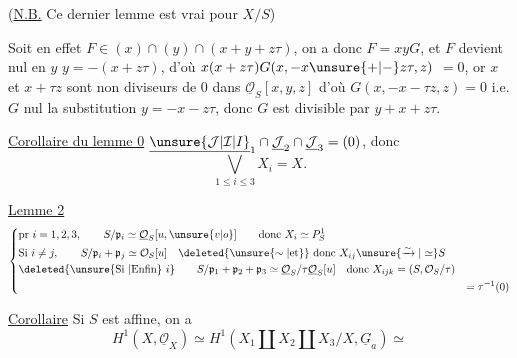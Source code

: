 (\uline{N.B.} Ce dernier lemme est vrai pour $X/S$)

Soit en effet $F\in(x)\cap(y)\cap(x+y+z\tau)$, on a donc $F=xyG$, et $F$ devient nul en $y$  $y=-(x+z\tau)$, d'où $x(x+z\tau)G(x,-x\unsure{+|-}z\tau,z)$ $=0$, or $x$ et $x+\tau z$ sont non diviseurs de $0$ dans $\underline{\mathcal O}_S[x,y,z]$   d'où $G(x,-x-\tau z,z)=0$ i.e. $G$   nul  la substitution $y=-x-z\tau$, donc $G$ est divisible par $y+x+z\tau$.

\uline{Corollaire du lemme 0} $\underline{\unsure{\mathcal J|\mathcal I|I}}_1\cap\underline{\mathcal J}_2\cap\underline{\mathcal J}_3=(0)$, donc
\[
\bigvee_{1\le i\le3}X_i=X.
\]

\uline{Lemme 2}  
\[
\left\{\begin{aligned}
&\text{pr }i=1,2,3,\qquad S/\mathfrak p_i\simeq\underline{\mathcal O}_S[u,\unsure{v|o}]\qquad\text{donc }X_i\simeq P^1_S\\
&\text{Si }i\ne j,\qquad S/\mathfrak p_i+\mathfrak p_j\simeq\mathcal O_S[u]\quad\deleted{\unsure{\sim|\text{et}}}\ \text{donc }X_{ij}\unsure{\xrightarrow{\sim}|\simeq} S\\
&\deleted{\text{\unsure{Si |Enfin} }i}\qquad S/\mathfrak p_1+\mathfrak p_2+\mathfrak p_3\simeq\underline{\mathcal O}_S/\tau\underline{\mathcal O}_S[u]\quad\text{donc }X_{ijk}=(S,\mathcal O_S/\tau)\\
&&=\tau^{-1}(0)
\end{aligned}\right.
\]

\uline{Corollaire} Si $S$ est affine, on a
\[
H^1(X,\underline{\mathcal O}_X)\simeq H^1(X_1\amalg X_2\amalg X_3/X,\underline G_a)\simeq
\]
